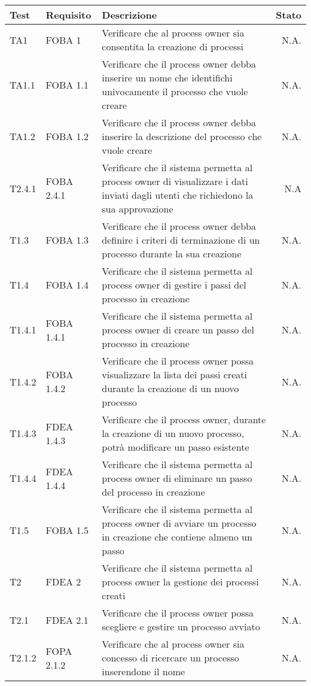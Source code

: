 \begin{longtable}{llXr}%
\toprule
\textbf{Test} & \textbf{Requisito} & \textbf{Descrizione} & \textbf{Stato}\\
\toprule
TA1&FOBA 1&Verificare che al process owner sia consentita la creazione di processi&N.A.\\
\midrule
TA1.1&FOBA 1.1&Verificare che il process owner debba inserire un nome che identifichi univocamente il processo che vuole creare&N.A.\\
\midrule
TA1.2&FOBA 1.2&Verificare che il process owner debba inserire la descrizione del processo che vuole creare &N.A.\\
\midrule
T2.4.1&FOBA 2.4.1&Verificare che il sistema permetta al process owner di visualizzare i dati inviati dagli utenti che richiedono la sua approvazione&N.A\\
\midrule
T1.3&FOBA 1.3&Verificare che il process owner debba definire i criteri di terminazione di un processo durante la sua creazione&N.A.\\
\midrule
T1.4&FOBA 1.4&Verificare che il sistema permetta al process owner di gestire i passi del processo in creazione&N.A.\\
T1.4.1&FOBA 1.4.1&Verificare che il sistema permetta al process owner di creare un passo del processo in creazione&N.A.\\
\midrule
T1.4.2&FOBA 1.4.2&Verificare che il process owner possa visualizzare la lista dei passi creati durante la creazione di un nuovo processo&N.A.\\
\midrule
T1.4.3&FDEA 1.4.3&Verificare che il process owner, durante la creazione di un nuovo processo, potrà modificare un passo esistente&N.A.\\
\midrule
T1.4.4&FDEA 1.4.4&Verificare che il sistema permetta al process owner di eliminare un passo del processo in creazione&N.A.\\
\midrule
T1.5&FOBA 1.5&Verificare che il sistema permetta al process owner di avviare un processo in creazione che contiene almeno un passo&N.A.\\
\midrule
T2&FDEA 2&Verificare che il sistema permetta al process owner la gestione dei processi creati&N.A.\\
T2.1&FDEA 2.1&Verificare che il process owner possa scegliere e gestire un processo avviato&N.A.\\
\midrule
T2.1.2&FOPA 2.1.2&Verificare che al process owner sia concesso di ricercare un processo inserendone il nome&N.A.\\

\end{longtable}
